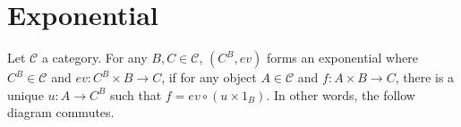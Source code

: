 \documentclass[./main.tex]{subfiles}
\begin{document}
\section{Exponential}

\begin{definition}
  Let $\mathcal{C}$ a category.
  For any $B, C \in \mathcal{C}$, $(C^B, ev)$ forms an exponential
  where $C^B \in \mathcal{C}$ and $ev : C^B \times B \rightarrow C$,
  if for any object $A \in \mathcal{C}$ and $f : A \times B \rightarrow C$,
  there is a unique $u : A \rightarrow C^B$ such that $f = ev \circ (u \times 1_B)$.
  In other words, the follow diagram commutes.
  \begin{center}
  \end{center}
\end{definition}
\end{document}
